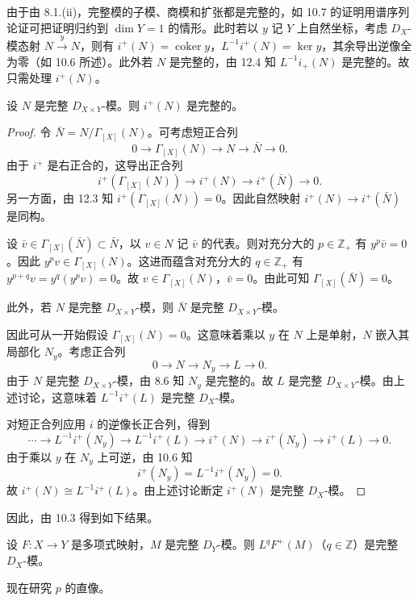 由于由 8.1.(ii)，完整模的子模、商模和扩张都是完整的，如 10.7 的证明用谱序列论证可把证明归约到 $\dim Y=1$ 的情形。此时若以 $y$ 记 $Y$ 上自然坐标，考虑 $D_X$-模态射 $N\xrightarrow{\ y\ }N$，则有 $i^+(N)=\operatorname{coker}y$，$L^{-1}i^+(N)=\ker y$，其余导出逆像全为零（如 10.6 所述）。此外若 $N$ 是完整的，由 12.4 知 $L^{-1}i_+(N)$ 是完整的。故只需处理 $i^+(N)$。

\begin{lemma}
设 $N$ 是完整 $D_{X\times Y}$-模。则 $i^+(N)$ 是完整的。
\end{lemma}

\begin{proof}
令 $\bar N=N/\Gamma_{[X]}(N)$。可考虑短正合列
$$0\longrightarrow\Gamma_{[X]}(N)\longrightarrow N\longrightarrow\bar N\longrightarrow 0.$$
由于 $i^+$ 是右正合的，这导出正合列
$$i^+(\Gamma_{[X]}(N))\longrightarrow i^+(N)\longrightarrow i^+(\bar N)\longrightarrow 0.$$
另一方面，由 12.3 知 $i^+(\Gamma_{[X]}(N))=0$。因此自然映射 $i^+(N)\to i^+(\bar N)$ 是同构。

设 $\bar v\in\Gamma_{[X]}(\bar N)\subset\bar N$，以 $v\in N$ 记 $\bar v$ 的代表。则对充分大的 $p\in\mathbb{Z}_+$ 有 $y^p\bar v=0$。因此 $y^p v\in\Gamma_{[X]}(N)$。这进而蕴含对充分大的 $q\in\mathbb{Z}_+$ 有 $y^{p+q}v=y^q(y^pv)=0$。故 $v\in\Gamma_{[X]}(N)$，$\bar v=0$。由此可知 $\Gamma_{[X]}(\bar N)=0$。

此外，若 $N$ 是完整 $D_{X\times Y}$-模，则 $\bar N$ 是完整 $D_{X\times Y}$-模。

因此可从一开始假设 $\Gamma_{[X]}(N)=0$。这意味着乘以 $y$ 在 $N$ 上是单射，$N$ 嵌入其局部化 $N_y$。考虑正合列
$$0\longrightarrow N\longrightarrow N_y\longrightarrow L\longrightarrow 0.$$
由于 $N$ 是完整 $D_{X\times Y}$-模，由 8.6 知 $N_y$ 是完整的。故 $L$ 是完整 $D_{X\times Y}$-模。由上述讨论，这意味着 $L^{-1}i^+(L)$ 是完整 $D_X$-模。

对短正合列应用 $i$ 的逆像长正合列，得到
$$\cdots\to L^{-1}i^+(N_y)\to L^{-1}i^+(L)\to i^+(N)\to i^+(N_y)\to i^+(L)\to 0.$$
由于乘以 $y$ 在 $N_y$ 上可逆，由 10.6 知
$$i^+(N_y)=L^{-1}i^+(N_y)=0.$$
故 $i^+(N)\cong L^{-1}i^+(L)$。由上述讨论断定 $i^+(N)$ 是完整 $D_X$-模。
\end{proof}

因此，由 10.3 得到如下结果。

\begin{theorem}
设 $F:X\to Y$ 是多项式映射，$M$ 是完整 $D_Y$-模。则 $L^qF^+(M)$（$q\in\mathbb{Z}$）是完整 $D_X$-模。
\end{theorem}

现在研究 $p$ 的直像。

